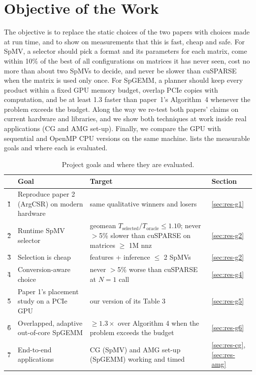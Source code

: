 \section{Objective of the Work}\label{sec:objective}

The objective is to replace the static choices of the two papers with choices made at run time, and to show on
measurements that this is fast, cheap and safe. For SpMV, a selector should pick a format and its parameters for
each matrix, come within 10\% of the best of all configurations on matrices it has never seen, cost no more than about
two SpMVs to decide, and never be slower than cuSPARSE when the matrix is used only once. For SpGEMM, a planner should
keep every product within a fixed GPU memory budget, overlap PCIe copies with computation, and be at least 1.3\x{}
faster than paper~1's Algorithm~4 whenever the problem exceeds the budget. Along the way we re-test both papers'
claims on current hardware and libraries, and we show both techniques at work inside real applications (CG and AMG
set-up). Finally, we compare the GPU with sequential and OpenMP CPU versions on the same machine.
 lists the measurable goals and where each is evaluated.

\begin{table}[t]
\centering\small
\caption{Project goals and where they are evaluated.}\label{tab:goals}
\begin{tabular}{@{}lp{6.4cm}p{6.6cm}l@{}}
\toprule
 & Goal & Target & Section \\
\midrule
\G1 & Reproduce paper 2 (ArgCSR) on modern hardware & same qualitative winners and losers & \ref{sec:res-g1} \\
\G2 & Runtime SpMV selector & geomean $T_\text{selected}/T_\text{oracle} \le 1.10$; never $>$5\% slower than cuSPARSE on matrices $\ge$ 1M nnz & \ref{sec:res-g2} \\
\G3 & Selection is cheap & features + inference $\le$ 2 SpMVs & \ref{sec:res-g2} \\
\G4 & Conversion-aware choice & never $>$5\% worse than cuSPARSE at $N=1$ call & \ref{sec:res-g4} \\
\G5 & Paper 1's placement study on a PCIe GPU & our version of its Table 3 & \ref{sec:res-g5} \\
\G6 & Overlapped, adaptive out-of-core SpGEMM & $\ge 1.3\times$ over Algorithm 4 when the problem exceeds the budget & \ref{sec:res-g6} \\
\G7 & End-to-end applications & CG (SpMV) and AMG set-up (SpGEMM) working and timed & \ref{sec:res-cg}, \ref{sec:res-amg} \\
\bottomrule
\end{tabular}
\end{table}
